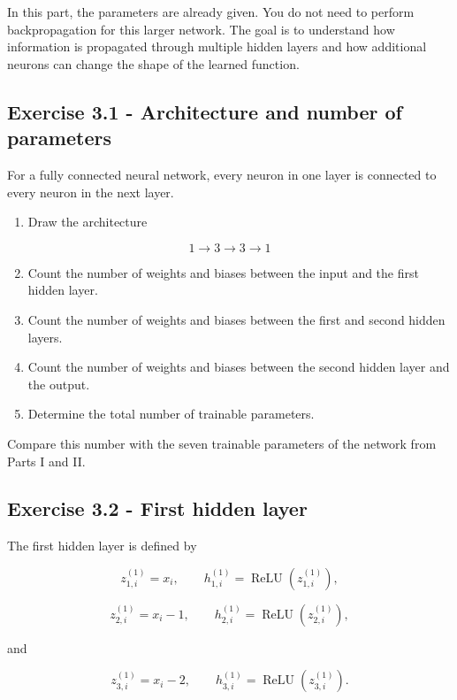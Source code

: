 \documentclass{course_sheet}
\begin{document}
In this part, the parameters are already given. You do not need to perform backpropagation for this larger network. The goal is to understand how information is propagated through multiple hidden layers and how additional neurons can change the shape of the learned function.

\subsection*{Exercise 3.1 - Architecture and number of parameters}
For a fully connected neural network, every neuron in one layer is connected to every neuron in the next layer.

\begin{enumerate}
\item
Draw the architecture

\end{enumerate}
\[
1\rightarrow3\rightarrow3\rightarrow1
\]

\begin{enumerate}
\setcounter{enumi}{1}
\item
Count the number of weights and biases between the input and the first hidden layer.

\item
Count the number of weights and biases between the first and second hidden layers.

\item
Count the number of weights and biases between the second hidden layer and the output.

\item
Determine the total number of trainable parameters.

\end{enumerate}
Compare this number with the seven trainable parameters of the network from Parts I and II.

\subsection*{Exercise 3.2 - First hidden layer}
The first hidden layer is defined by

\[
z^{(1)}_{1,i}=x_i,
\qquad
h^{(1)}_{1,i}=\operatorname{ReLU}(z^{(1)}_{1,i}),
\]

\[
z^{(1)}_{2,i}=x_i-1,
\qquad
h^{(1)}_{2,i}=\operatorname{ReLU}(z^{(1)}_{2,i}),
\]

and

\[
z^{(1)}_{3,i}=x_i-2,
\qquad
h^{(1)}_{3,i}=\operatorname{ReLU}(z^{(1)}_{3,i}).
\]
\end{document}
